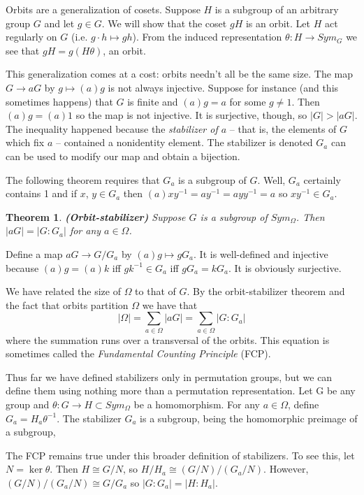 \documentclass[letterpaper]{article}
\newtheorem{theorem}{Theorem}[section]
\newenvironment{proof}[1][Proof]{\begin{trivlist}
\item[\hskip \labelsep {\bfseries #1}]}{\end{trivlist}}
\begin{document}
Orbits are a generalization of cosets. Suppose $H$ is a subgroup of an arbitrary group $G$ and let $g \in G$. We will show that the coset $gH$ is an orbit. Let $H$ act regularly on $G$ (i.e. $g\cdot h \mapsto gh$). From the induced representation $\theta \colon H \rightarrow Sym_G$ we see that $gH = g(H\theta)$, an orbit.

This generalization comes at a cost: orbits needn't all be the same size. The map $G \rightarrow aG$ by $g \mapsto (a)g$ is not always injective. Suppose for instance (and this sometimes happens) that $G$ is finite and $(a)g = a$ for some $g \ne 1$. Then $(a)g = (a)1$ so the map is not injective. It is surjective, though, so $|G| > |aG|$. The inequality happened because the \emph{stabilizer of $a$} -- that is, the elements of $G$ which fix $a$ -- contained a nonidentity element. The stabilizer is denoted $G_a$ can can be used to modify our map and obtain a bijection.

The following theorem requires that $G_a$ is a subgroup of $G$. Well, $G_a$ certainly contains 1 and if $x$, $y \in G_a$ then $(a)xy^{-1} = ay^{-1} = ayy^{-1} = a$ so $xy^{-1} \in G_a$.

\begin{theorem}
\emph{\textbf{(Orbit-stabilizer)}}
Suppose $G$ is a subgroup of $Sym_\Omega$. Then $|aG| = |G \colon G_a|$ for any $a \in \Omega$.
\end{theorem}
\begin{proof}
Define a map $aG \rightarrow G/G_a$ by $(a)g \mapsto gG_a$. It is well-defined and injective because $(a)g = (a)k$ iff $gk^{-1} \in G_a$ iff $gG_a = kG_a$. It is obviously surjective.
\end{proof}

We have related the size of $\Omega$ to that of $G$. By the orbit-stabilizer theorem and the fact that orbits partition $\Omega$ we have that
\[|\Omega| = \sum_{a \in \Omega} |aG| = \sum_{a \in \Omega} |G \colon G_a|\]
where the summation runs over a transversal of the orbits. This equation is sometimes called the \emph{Fundamental Counting Principle} (FCP).

Thus far we have defined stabilizers only in permutation groups, but we can define them using nothing more than a permutation representation. Let G be any group and $\theta \colon G \rightarrow H \subset Sym_\Omega$ be a homomorphism. For any $a \in \Omega$, define $G_a = H_a\theta^{-1}$. The stabilizer $G_a$ is a subgroup, being the homomorphic  preimage of a subgroup,

The FCP remains true under this broader definition of stabilizers. To see this, let $N = \ker \theta$. Then $H \cong G/N$, so $H/H_a \cong (G/N)/(G_a/N)$. However, $(G/N)/(G_a/N) \cong G/G_a$ so $|G \colon G_a| = |H \colon H_a|$.
\end{document}
